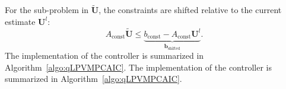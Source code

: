 For the sub-problem in $\tilde{\bm{U}}$, the constraints are shifted relative to the current estimate $\bm{U}^l$:
\[
A_{\text{const}} \tilde{\bm{U}} \le \underbrace{b_{\text{const}} - A_{\text{const}} \bm{U}^l}_{\bm{b}_{\text{shifted}}}.
\]
%
The implementation of the controller is summarized in Algorithm~\ref{algo:qLPVMPCAIC}. 
The implementation of the controller is summarized in Algorithm~\ref{algo:qLPVMPCAIC}.
